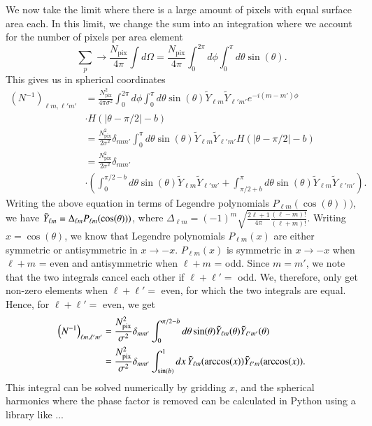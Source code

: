 \documentclass[twocolumn]{../common/aa}
\begin{document}
We now take the limit where there is a large amount of pixels with equal surface area each. In this limit, we change the sum into an integration where we account for the number of pixels per area element
\begin{equation}
\sum_p \rightarrow \frac{N_{\mathrm{pix}}}{4\pi}\int d\Omega  = \frac{N_{\mathrm{pix}}}{4\pi}\int_{0}^{2\pi} d\phi \int_{0}^{\pi} d\theta \sin(\theta).
\end{equation}
This gives us in spherical coordinates
\begin{align}
\nonumber
\left(N^{-1}\right)_{\ell m, \ell' m'} &= \frac{N_{\mathrm{pix}}^2}{4\pi \sigma^2}\int_{0}^{2\pi} d\phi \int_{0}^{\pi} d\theta \sin(\theta)\tilde{Y}_{\ell m}  \tilde{Y}_{\ell' m'}  e^{-i(m-m')\phi}
\\
\nonumber
&\cdot H(|\theta -\pi/2|-b)\\
\nonumber
&= \frac{N_{\mathrm{pix}}^2}{2\sigma^2} \delta_{mm'}\int_{0}^{\pi} d\theta \sin(\theta)\tilde{Y}_{\ell m}  \tilde{Y}_{\ell' m'} H(|\theta -\pi/2|-b)\\
\nonumber
&= \frac{N_{\mathrm{pix}}^2}{2\sigma^2} \delta_{mm'}\\
&\cdot \left(\int_{0}^{\pi/2-b} d\theta \sin(\theta) \tilde{Y}_{\ell m}  \tilde{Y}_{\ell' m'}+\int_{\pi/2+b}^{\pi} d\theta \sin(\theta)\tilde{Y}_{\ell m}  \tilde{Y}_{\ell' m'}\right).
\end{align}
Writing the above equation in terms of Legendre polynomials $P_{\ell m}(\cos(\theta)))$, we have
$\Tilde{Y}_{\ell m} = \Delta_{\ell m}P_{\ell m}(\cos(\theta)))$, where ${\Delta_{\ell m}=(-1)^m \sqrt{\frac{2\ell+1}{4\pi}\frac{(\ell - m)!}{(\ell+m)!}}}$.
 Writing $x=\cos(\theta)$, we know that Legendre polynomials $P_{\ell m}(x)$ are either symmetric or antisymmetric in $x\rightarrow-x$. $P_{\ell m}(x)$ is symmetric in $x \rightarrow -x$ when $\ell+m$ = even and antisymmetric when $\ell+m$ = odd. Since $m=m'$, we note that the two integrals cancel each other if $\ell+\ell' =$ odd. We, therefore, only get non-zero elements when $\ell + \ell' =$ even, for which the two integrals are equal. Hence, for $\ell + \ell'=$ even, we get
\begin{align}
\nonumber
\left(N^{-1}\right)_{\ell m, \ell' m'} &= \frac{N_{\mathrm{pix}}^2}{\sigma^2} \delta_{mm'}\int_{0}^{\pi/2-b} d\theta \sin(\theta)\Tilde{Y}_{\ell m}(\theta)\Tilde{Y}_{\ell' m'}(\theta)\\
\label{eq:finished_n_inv}
&=\frac{N_{\mathrm{pix}}^2}{\sigma^2} \delta_{mm'}\int_{\sin(b)}^{1} dx \, \Tilde{Y}_{\ell m}(\arccos(x)) \Tilde{Y}_{\ell' m}(\arccos(x)).
\end{align}
This integral can be solved numerically by gridding $x$, and the spherical harmonics where the phase factor is removed can be calculated in Python using a library like ...
\end{document}
